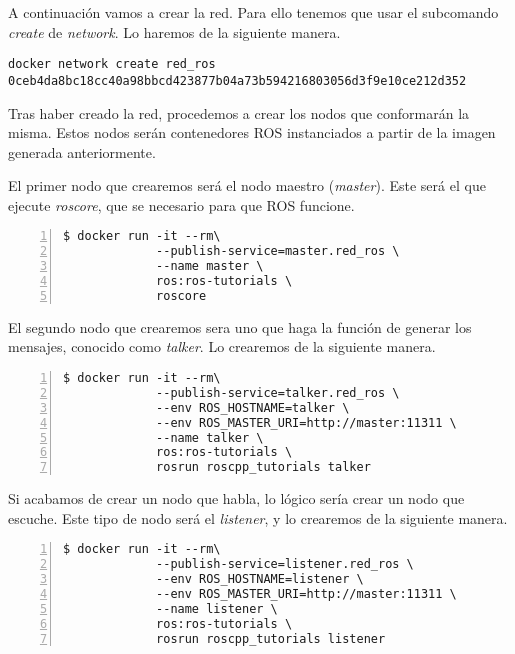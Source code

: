 	A continuación vamos a crear la red. Para ello tenemos que usar el subcomando \emph{create} de \emph{network}. Lo haremos de la siguiente manera.

	\begin{lstlisting}[style=consola]
docker network create red_ros
0ceb4da8bc18cc40a98bbcd423877b04a73b594216803056d3f9e10ce212d352
	\end{lstlisting}
	
	Tras haber creado la red, procedemos a crear los nodos que conformarán la misma. Estos nodos serán contenedores ROS instanciados a partir de la imagen generada anteriormente.

	El primer nodo que crearemos será el nodo maestro (\emph{master}). Este será el que ejecute \emph{roscore}, que se necesario para que ROS funcione.

	\begin{lstlisting}[style=consola,numbers=left]
$ docker run -it --rm\
             --publish-service=master.red_ros \
             --name master \
             ros:ros-tutorials \
             roscore
	\end{lstlisting}
	

	El segundo nodo que crearemos sera uno que haga la función de generar los mensajes, conocido como \emph{talker}. Lo crearemos de la siguiente manera.
		
	\begin{lstlisting}[style=consola,numbers=left]
$ docker run -it --rm\
             --publish-service=talker.red_ros \
             --env ROS_HOSTNAME=talker \
             --env ROS_MASTER_URI=http://master:11311 \
             --name talker \
             ros:ros-tutorials \
             rosrun roscpp_tutorials talker
	\end{lstlisting}
	

	Si acabamos de crear un nodo que habla, lo lógico sería crear un nodo que escuche. Este tipo de nodo será el \emph{listener}, y lo crearemos de la siguiente manera.

	\begin{lstlisting}[style=consola,numbers=left]
$ docker run -it --rm\
             --publish-service=listener.red_ros \
             --env ROS_HOSTNAME=listener \
             --env ROS_MASTER_URI=http://master:11311 \
             --name listener \
             ros:ros-tutorials \
             rosrun roscpp_tutorials listener
	\end{lstlisting}
	
